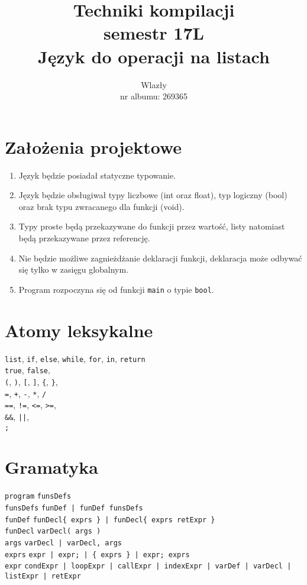 \documentclass{article}
\title{\vspace{7cm}\LARGE Techniki kompilacji\\semestr 17L\\Język do operacji na listach}
\author{\LargeŁukasz Wlazły\\nr albumu: 269365}
\date{}
\newcommand{\keyword}[1]{\colorbox{light-gray}{\texttt{#1}}}
\newcommand{\code}[1]{\texttt{#1}}
\begin{document}
\maketitle
{}
\newpage
{}

\section{Założenia projektowe}
\begin{enumerate}
\item Język będzie posiadał statyczne typowanie.
\item Język będzie obsługiwał typy liczbowe (int oraz float), typ logiczny (bool) oraz brak typu zwracanego dla funkcji (void).
\item Typy proste będą przekazywane do funkcji przez wartość, listy natomiast będą przekazywane przez referencję.
\item Nie będzie możliwe zagnieżdżanie deklaracji funkcji, deklaracja może odbywać się tylko w zasięgu globalnym.
\item Program rozpoczyna się od funkcji \code{main} o typie \keyword{bool}.
\end{enumerate}

\section{Atomy leksykalne}
\keyword{list}, \keyword{if}, \keyword{else}, \keyword{while}, \keyword{for}, \keyword{in}, \keyword{return}\\
\keyword{true}, \keyword{false}, \\
\keyword{(}, \keyword{)}, \keyword{[}, \keyword{]}, \keyword{\{}, \keyword{\}}, \\
\keyword{=}, \keyword{+}, \keyword{-}, \keyword{*}, \keyword{/} \\
\keyword{==}, \keyword{!=}, \keyword{<=}, \keyword{>=}, \\
\keyword{\&\&}, \keyword{||}, \\
\keyword{;}
\newpage
\section{Gramatyka}
\code{program} \textrightarrow \code{funsDefs} \\
\code{funsDefs} \textrightarrow \code{funDef | funDef funsDefs} \\
\code{funDef} \textrightarrow \code{funDecl\{ exprs \} | funDecl\{ exprs retExpr \}} \\
\code{funDecl} \textrightarrow \code{varDecl( args )} \\
\code{args} \textrightarrow \code{varDecl | varDecl, args} \\
\code{exprs} \textrightarrow \code{expr | expr\keyword{;} | \keyword{\{} exprs \keyword{\}} | expr\keyword{;} exprs} \\
\code{expr} \textrightarrow \code{condExpr | loopExpr | callExpr | indexExpr | varDef | varDecl | listExpr | retExpr} \\
\end{document}

